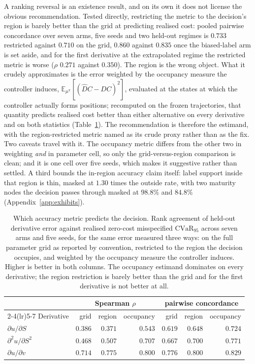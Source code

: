 \documentclass{article}
\begin{document}
A ranking reversal is an existence result, and on its own it does not license the
obvious recommendation. Tested directly, restricting the metric to the decision's
region is barely better than the grid at predicting realised cost: pooled pairwise
concordance over seven arms, five seeds and two held-out regimes is $0.733$
restricted against $0.710$ on the grid, $0.860$ against $0.835$ once the
biased-label arm is set aside, and for the first derivative at the extrapolated
regime the restricted metric is worse ($\rho$ $0.271$ against $0.350$). The region
is the wrong object. What it crudely approximates is the error weighted by the
occupancy measure the controller induces,
$\mathbb{E}_{\mu^{\pi}}[(\hat{D}C - DC)^{2}]$, evaluated at the states at which the
controller actually forms positions; recomputed on the frozen trajectories, that
quantity predicts realised cost better than either alternative on every derivative
and on both statistics (Table~\ref{tab:metric}). The recommendation is therefore the
estimand, with the region-restricted metric named as its crude proxy rather than as
the fix. Two caveats travel with it. The occupancy metric differs from the other two
in weighting \emph{and} in parameter cell, so only the grid-versus-region comparison
is clean; and it is one cell over five seeds, which makes it suggestive rather than
settled. A third bounds the in-region accuracy claim itself: label support inside
that region is thin, masked at $1.30$ times the outside rate, with two maturity
nodes the decision passes through masked at $98.8\%$ and $84.8\%$
(Appendix~\ref{app:exhibits}).

\begin{table}[!htbp]
\caption{Which accuracy metric predicts the decision. Rank agreement of held-out
derivative error against realised zero-cost misspecified $\mathrm{CVaR}_{95}$ across
seven arms and five seeds, for the same error measured three ways: on the full
parameter grid as reported by convention, restricted to the region the decision
occupies, and weighted by the occupancy measure the controller induces. Higher is
better in both columns. The occupancy estimand dominates on every derivative; the
region restriction is barely better than the grid and for the first derivative is
not better at all.}
\label{tab:metric}
\centering\footnotesize\setlength{\tabcolsep}{6pt}
\begin{tabular}{@{}lrrrrrr@{}}
\toprule
& \multicolumn{3}{c}{Spearman $\rho$} & \multicolumn{3}{c}{pairwise concordance} \\
\cmidrule(lr){2-4}\cmidrule(lr){5-7}
Derivative & grid & region & occupancy & grid & region & occupancy \\
\midrule
$\partial u/\partial S$ & $0.386$ & $0.371$ & $\mathbf{0.543}$ & $0.619$ & $0.648$ & $\mathbf{0.724}$ \\
$\partial^{2}u/\partial S^{2}$ & $0.468$ & $0.507$ & $\mathbf{0.707}$ & $0.667$ & $0.700$ & $\mathbf{0.771}$ \\
$\partial u/\partial v$ & $0.714$ & $0.775$ & $\mathbf{0.800}$ & $0.776$ & $0.800$ & $\mathbf{0.829}$ \\
\bottomrule
\end{tabular}
\end{table}
\end{document}

